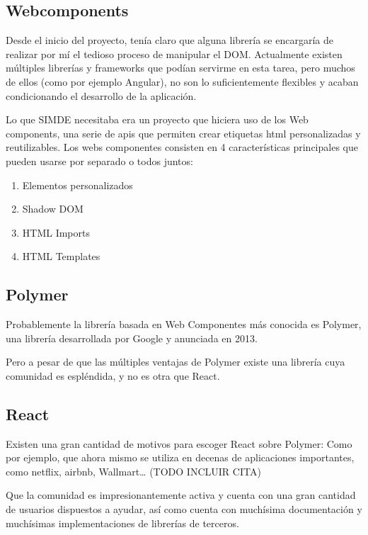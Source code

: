 \subsection{Webcomponents}

Desde el inicio del proyecto, tenía claro que alguna librería se encargaría de realizar 
por mí el tedioso proceso de manipular el DOM. Actualmente existen múltiples librerías 
y frameworks que podían servirme en esta tarea, pero muchos de ellos (como por ejemplo Angular),
 no son lo suficientemente flexibles y acaban condicionando el desarrollo de la aplicación.

\bigskip
Lo que SIMDE necesitaba era un proyecto que hiciera uso de los Web components, 
una serie de apis que permiten crear etiquetas html personalizadas y reutilizables. 
Los webs componentes consisten en 4 características principales que pueden usarse 
por separado o todos juntos:

\begin{enumerate}

\item Elementos personalizados
\item Shadow DOM
\item HTML Imports
\item HTML Templates

\end{enumerate}

\subsection{Polymer}
Probablemente la librería basada en Web Componentes más conocida es Polymer,
una librería desarrollada por Google y anunciada en 2013. 

\bigskip

Pero a pesar de que las múltiples ventajas de Polymer existe una librería cuya comunidad es espléndida,
 y no es otra que React.

\subsection{React}
Existen una gran cantidad de motivos para escoger React sobre Polymer: Como por ejemplo, 
que ahora mismo se utiliza en decenas de aplicaciones importantes, como netflix, airbnb, Wallmart… (TODO INCLUIR CITA)

\bigskip
Que la comunidad es impresionantemente activa y cuenta con una gran cantidad de usuarios dispuestos a ayudar, así como cuenta con muchísima documentación y muchísimas implementaciones de librerías de terceros.

